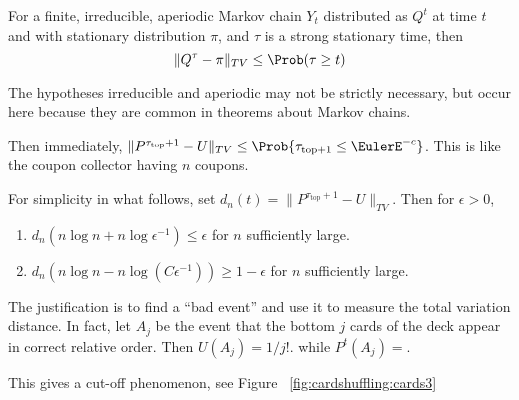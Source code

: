 \documentclass[12pt]{article}
\begin{document}
\begin{theorem}
    For a finite, irreducible, aperiodic Markov chain \( Y_t \)
    distributed as \( Q^t \) at time \( t \) and with stationary
    distribution \( \pi \), and \( \tau \) is a strong stationary time,
    then
    \[
        \| Q^{\tau} - \pi \|_{TV} \le \Prob(\tau \ge t)
    \]
\end{theorem}

\begin{remark}
    The hypotheses irreducible and aperiodic may not be strictly
    necessary, but occur here because they are common in theorems about
    Markov chains.
\end{remark}

Then immediately, \( \| P^{\tau_{\text{top}}+1} - U \|_{TV} \le \Prob{\tau_
{\text{top}+1} \le \EulerE^{-c}} \).  This is like the coupon collector
having \( n \) coupons.

For simplicity in what follows, set \( d_n(t) = \| P^{\tau_{\text{top}}+1}
- U \|_{TV} \).  Then for \( \epsilon > 0 \),
\begin{enumerate}
    \item
        \( d_{n}(n \log n + n \log \epsilon^{-1} )\le \epsilon \) for \(
        n \) sufficiently large.
    \item
        \( d_{n}(n \log n - n \log (C \epsilon^{-1})) \ge 1-\epsilon \)
        for \( n \) sufficiently large.
\end{enumerate}

The justification is to find a ``bad event'' and use it to measure the
total variation distance.  In fact, let \( A_j \) be the event that the
bottom \( j \) cards of the deck appear in correct relative order.  Then
\( U(A_j) = 1/j! \).  while \( P^t(A_j) = \).

This gives a cut-off phenomenon, see Figure~%
\ref{fig:cardshuffling:cards3}
\end{document}
